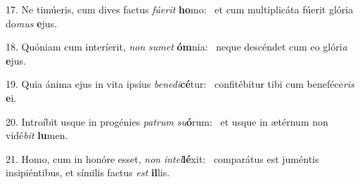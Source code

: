 17. Ne timúeris, cum dives factus \textit{fú}\textit{e}\textit{rit} \textbf{ho}mo: \ast\  et cum multiplicáta fúerit glória do\textit{mus} \textbf{e}jus.\

18. Quóniam cum interíerit, \textit{non} \textit{su}\textit{met} \textbf{óm}nia: \ast\  neque descéndet cum eo glóri\textit{a} \textbf{e}jus.\

19. Quia ánima ejus in vita ipsíus \textit{be}\textit{ne}\textit{di}\textbf{cé}tur: \ast\  confitébitur tibi cum beneféce\textit{ris} \textbf{e}i.\

20. Introíbit usque in progénies \textit{pa}\textit{trum} \textit{su}\textbf{ó}rum: \ast\  et usque in ætérnum non vidé\textit{bit} \textbf{lu}men.\

21. Homo, cum in honóre esset, \textit{non} \textit{in}\textit{tel}\textbf{lé}xit: \ast\  comparátus est juméntis insipiéntibus, et símilis factus \textit{est} \textbf{il}lis.\


